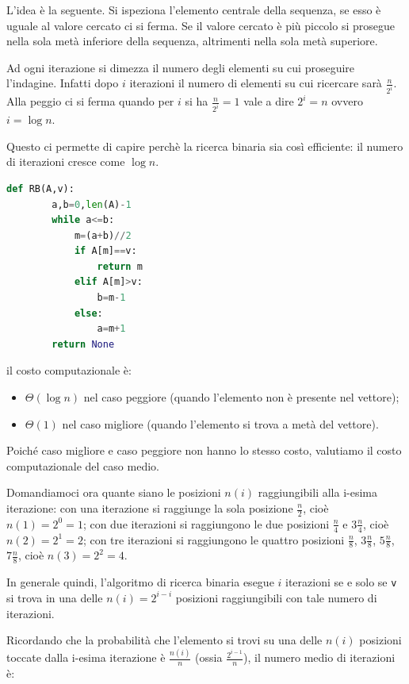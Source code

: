 L'idea è la seguente. Si ispeziona l’elemento centrale della sequenza, se esso è uguale al valore cercato ci si ferma. Se il valore cercato è più piccolo si prosegue nella sola metà inferiore della sequenza, altrimenti nella sola metà superiore.

Ad ogni iterazione si dimezza il numero degli elementi su cui proseguire l’indagine. 
Infatti dopo $i$ iterazioni il numero di elementi su cui ricercare sarà $\frac{n}{2^i}$. Alla peggio ci si ferma quando per $i$ si ha $\frac{n}{2^i}=1$ vale a dire $2^i=n$ ovvero $i=\log n$.

Questo ci permette di capire perchè la ricerca binaria sia così efficiente: il numero di iterazioni cresce come $\log n$. 

\begin{lstlisting}[language=Python]
    def RB(A,v):
        a,b=0,len(A)-1
        while a<=b:
            m=(a+b)//2
            if A[m]==v:
                return m
            elif A[m]>v:
                b=m-1
            else:
                a=m+1
        return None
\end{lstlisting}

il costo computazionale è:
\begin{itemize}
    \item $\Theta(\log n)$ nel caso peggiore (quando l’elemento non è presente nel vettore);
    \item $\Theta(1)$ nel caso migliore (quando l'elemento si trova a metà del vettore).
\end{itemize}

Poiché caso migliore e caso peggiore non hanno lo stesso costo, valutiamo il costo computazionale del caso medio.

Domandiamoci ora quante siano le posizioni $n(i)$ raggiungibili alla i-esima iterazione: con una iterazione si raggiunge la sola posizione $\frac{n}{2}$, cioè $n(1)=2^0=1$; con due iterazioni si raggiungono le due posizioni $\frac{n}{4}$ e $3\frac{n}{4}$, cioè $n(2)=2^1=2$; con tre iterazioni si raggiungono le quattro posizioni $\frac{n}{8}$, $3\frac{n}{8}$, $5\frac{n}{8}$, $7\frac{n}{8}$, cioè $n(3)=2^2=4$.
    
In generale quindi, l’algoritmo di ricerca binaria esegue $i$ iterazioni se e solo se \verb|v| si trova in una delle $n(i)=2^{i-i}$ posizioni raggiungibili con tale numero di iterazioni.

Ricordando che la probabilità che l’elemento si trovi su una delle $n(i)$ posizioni toccate dalla i-esima iterazione è $\frac{n(i)}{n}$ (ossia $\frac{2^{i-1}}{n}$), il numero medio di iterazioni è:

